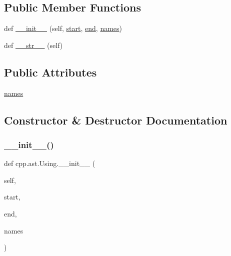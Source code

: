 \subsection*{Public Member Functions}
\begin{DoxyCompactItemize}
\item 
def \hyperlink{classcpp_1_1ast_1_1_using_a9b7a760a06d00f7211c889d9841e06af}{\+\_\+\+\_\+init\+\_\+\+\_\+} (self, \hyperlink{classcpp_1_1ast_1_1_node_a7b2aa97e6a049bb1a93aea48c48f1f44}{start}, \hyperlink{classcpp_1_1ast_1_1_node_a3c5e5246ccf619df28eca02e29d69647}{end}, \hyperlink{classcpp_1_1ast_1_1_using_abc05dedb59eb83857d373cc0e64eccb3}{names})
\item 
def \hyperlink{classcpp_1_1ast_1_1_using_ac209e8e5d84988d14a8f4b30377e5455}{\+\_\+\+\_\+str\+\_\+\+\_\+} (self)
\end{DoxyCompactItemize}
\subsection*{Public Attributes}
\begin{DoxyCompactItemize}
\item 
\hyperlink{classcpp_1_1ast_1_1_using_abc05dedb59eb83857d373cc0e64eccb3}{names}
\end{DoxyCompactItemize}


\subsection{Constructor \& Destructor Documentation}
\mbox{\label{classcpp_1_1ast_1_1_using_a9b7a760a06d00f7211c889d9841e06af}} 
\subsubsection{\texorpdfstring{\+\_\+\+\_\+init\+\_\+\+\_\+()}{\_\_init\_\_()}}
{\footnotesize\ttfamily def cpp.\+ast.\+Using.\+\_\+\+\_\+init\+\_\+\+\_\+ (\begin{DoxyParamCaption}\item[{}]{self,  }\item[{}]{start,  }\item[{}]{end,  }\item[{}]{names }\end{DoxyParamCaption})}



